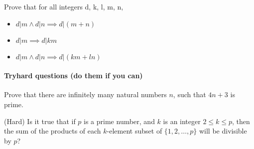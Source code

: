 \documentclass{exam}
\begin{document}
\begin{questions}
\question Prove that for all integers d, k, l, m, n,
\begin{itemize}
\item $d | m \wedge d | n \implies d | (m + n)$
\item $ d | m \implies d | k m$
\item $ d | m \wedge d | n \implies d | (k m + l n)$
\end{itemize} 

\end{questions}

\paragraph{Tryhard questions (do them if you can)}
\begin{questions}

\question Prove that there are infinitely many natural numbers $n$, such that $4n+3$ is prime.

\question (Hard) Is it true that if $p$ is a prime number, and $k$ is an integer $2 \le k \le p$, then the sum of the products of each $k$-element subset of $\{1, 2, \ldots, p\}$ will be divisible by $p$? 
\end{questions}
\end{document}
